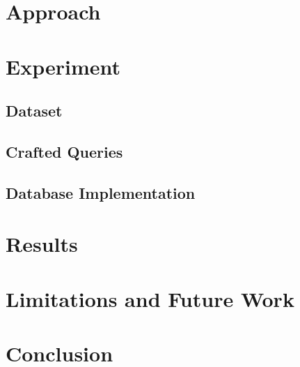 \documentclass[conference,11pt]{IEEEtran}
\begin{document}
\section{Approach}

\section{Experiment}
\subsection{Dataset}
\subsection{Crafted Queries}
\subsection{Database Implementation}

\section{Results}

\section{Limitations and Future Work}

\section{Conclusion}

{\printbibliography}
\end{document}
